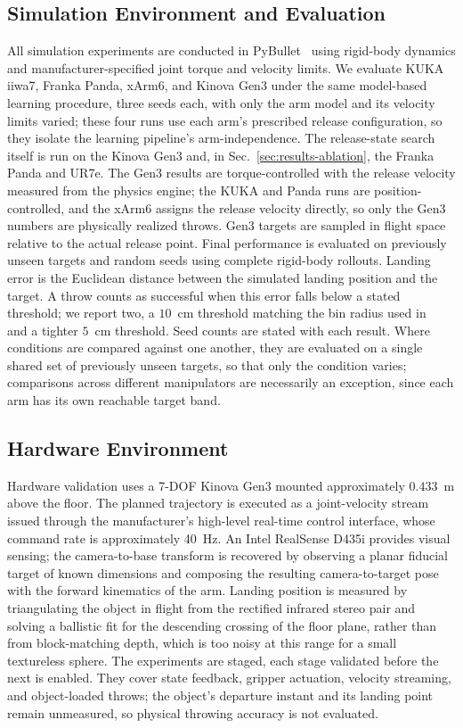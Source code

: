 \documentclass[letterpaper, 10 pt, conference]{ieeeconf}
\begin{document}
\subsection{Simulation Environment and Evaluation} \label{sec:setup-simulation}
All simulation experiments are conducted in PyBullet~\cite{coumans2021pybullet} using rigid-body dynamics and manufacturer-specified joint torque and velocity limits. We evaluate KUKA iiwa7, Franka Panda, xArm6, and Kinova Gen3 under the same model-based learning procedure, three seeds each, with only the arm model and its velocity limits varied; these four runs use each arm's prescribed release configuration, so they isolate the learning pipeline's arm-independence. The release-state search itself is run on the Kinova Gen3 and, in Sec.~\ref{sec:results-ablation}, the Franka Panda and UR7e. The Gen3 results are torque-controlled with the release velocity measured from the physics engine; the KUKA and Panda runs are position-controlled, and the xArm6 assigns the release velocity directly, so only the Gen3 numbers are physically realized throws. Gen3 targets are sampled in flight space relative to the actual release point. Final performance is evaluated on previously unseen targets and random seeds using complete rigid-body rollouts. Landing error is the Euclidean distance between the simulated landing position and the target. A throw counts as successful when this error falls below a stated threshold; we report two, a $10$~cm threshold matching the bin radius used in~\cite{turcato2025mcpilot} and a tighter $5$~cm threshold. Seed counts are stated with each result. Where conditions are compared against one another, they are evaluated on a single shared set of previously unseen targets, so that only the condition varies; comparisons across different manipulators are necessarily an exception, since each arm has its own reachable target band. 
\subsection{Hardware Environment} \label{sec:setup-hardware}
Hardware validation uses a 7-DOF Kinova Gen3 mounted approximately $0.433$~m above the floor. The planned trajectory is executed as a joint-velocity stream issued through the manufacturer's high-level real-time control interface, whose command rate is approximately 40~Hz. An Intel RealSense D435i provides visual sensing; the camera-to-base transform is recovered by observing a planar fiducial target of known dimensions and composing the resulting camera-to-target pose with the forward kinematics of the arm. Landing position is measured by triangulating the object in flight from the rectified infrared stereo pair and solving a ballistic fit for the descending crossing of the floor plane, rather than from block-matching depth, which is too noisy at this range for a small textureless sphere. The experiments are staged, each stage validated before the next is enabled. They cover state feedback, gripper actuation, velocity streaming, and object-loaded throws; the object's departure instant and its landing point remain unmeasured, so physical throwing accuracy is not evaluated.
\end{document}
